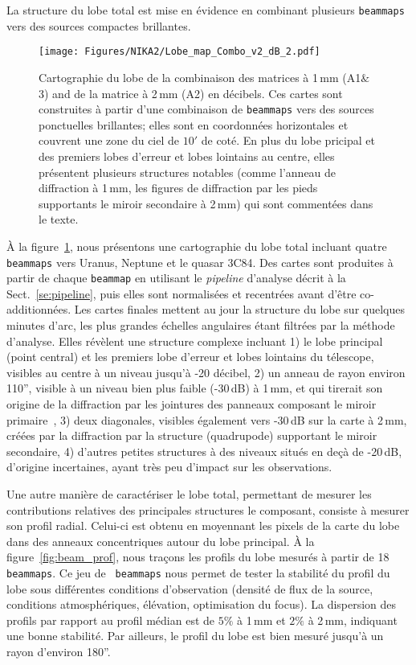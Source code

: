 La structure du lobe total est mise en évidence en combinant plusieurs
{\tt beammaps} vers des sources compactes brillantes.
\begin{figure}[!thbp]
\begin{center}
  \texttt{[image: Figures/NIKA2/Lobe\_map\_Combo\_v2\_dB\_2.pdf]}
\caption[Noticeable features of NIKA2 beam pattern.]{Cartographie du
  lobe de la combinaison des matrices à 1\,mm (A1$\&$3) and de la
  matrice à 2\,mm (A2) en décibels. Ces cartes sont construites à
  partir d'une combinaison de {\tt beammaps} vers des sources
  ponctuelles brillantes; elles sont en coordonnées horizontales et
  couvrent une zone du ciel de $10'$ de coté. En plus du lobe pricipal
  et des premiers lobes d'erreur et lobes lointains au centre, elles
  présentent plusieurs structures notables (comme l'anneau de
  diffraction à 1\,mm, les figures de diffraction par les pieds
  supportants le miroir secondaire à 2\,mm) qui sont commentées dans le
  texte.}
\label{fig:features}
\end{center}
\end{figure}
\`A la figure~\ref{fig:features}, nous présentons une cartographie du lobe
total incluant quatre {\tt beammaps} vers Uranus, Neptune et le quasar
3C84. Des cartes sont produites à partir de chaque {\tt beammap} en
utilisant le \emph{pipeline} d'analyse décrit à la
Sect.~\ref{se:pipeline}, puis elles sont normalisées et recentrées avant d'être
co-additionnées. Les cartes finales mettent au jour la structure du
lobe sur quelques minutes d'arc, les plus grandes échelles angulaires
étant filtrées par la méthode d'analyse. Elles révèlent une structure
complexe incluant 1) le lobe principal (point central) et les premiers
lobe d'erreur et lobes lointains du télescope, visibles au centre à un
niveau jusqu'à -20 décibel, 2) un anneau de rayon environ 110'',
visible à un niveau bien plus faible (-30\,dB) à 1\,mm, et qui
tirerait son origine de la diffraction par les jointures des panneaux
composant le miroir primaire~\citep{Greve2010}, 3) deux diagonales,
visibles également vers -30\,dB sur la carte à 2\,mm, créées par la
diffraction par la structure (quadrupode) supportant le miroir
secondaire, 4) d'autres petites structures à des niveaux situés en
deçà de -20\,dB, d'origine incertaines, ayant très peu d'impact sur
les observations.


Une autre manière de caractériser le lobe total, permettant de mesurer
les contributions relatives des principales structures le composant,
consiste à mesurer son profil radial. Celui-ci est obtenu en moyennant
les pixels de la carte du lobe dans des anneaux concentriques autour
du lobe principal. \`A la figure~\ref{fig:beam_prof}, nous traçons les
profils du lobe mesurés à partir de 18 {\tt beammaps}. Ce jeu de {\tt
  beammaps} nous permet de tester la stabilité du profil du lobe sous
différentes conditions d'observation (densité de flux de la source,
conditions atmosphériques, élévation, optimisation du focus). La
dispersion des profils par rapport au profil médian est de $5\%$ à
1\,mm et $2\%$ à 2\,mm, indiquant une bonne stabilité. Par ailleurs,
le profil du lobe est bien mesuré jusqu'à un rayon d'environ
180''.

